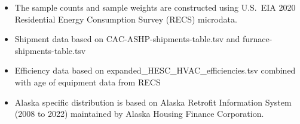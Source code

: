\begin{itemize}
\item The sample counts and sample weights are constructed using U.S.~EIA 2020 Residential Energy Consumption Survey (RECS) microdata.
\item Shipment data based on CAC-ASHP-shipments-table.tsv and furnace-shipments-table.tsv
\item Efficiency data based on expanded\_HESC\_HVAC\_efficiencies.tsv combined with age of equipment data from RECS
\item Alaska specific distribution is based on Alaska Retrofit Information System (2008 to 2022) maintained by Alaska Housing Finance Corporation.
\end{itemize}
